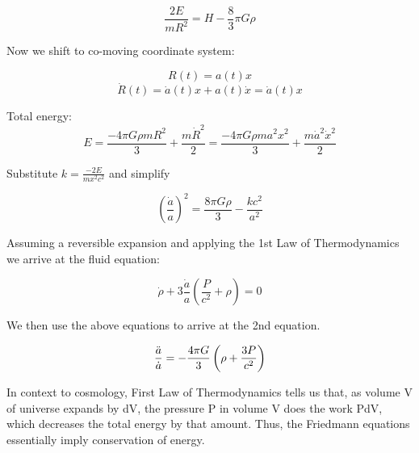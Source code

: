 \begin{equation*}
    \frac{2E}{mR^2}=H -\frac{8}{3} \pi G \rho
\end{equation*}

Now we shift to co-moving coordinate system:

\begin{equation*}
    R(t) = a(t) x
\end{equation*}
\begin{equation*}
     \Dot{R}(t) = \Dot{a}(t) x + a(t) \Dot{x} = \Dot{a}(t) x
\end{equation*}

Total energy:
\begin{equation*}
    E = \frac{-4 \pi G \rho m R^2}{3} + \frac{m \Dot{R}^2}{2} = \frac{-4 \pi G \rho ma^2 x^2}{3} + \frac{m \Dot{a}^2 \Dot{x}^2}{2}
\end{equation*}

Substitute $k = \frac{-2E}{mx^2c^2}$ and simplify

\begin{equation*}
    \left(\frac{\Dot{a}}{a}\right)^2 = \frac{8 \pi G \rho}{3} - \frac{kc^2}{a^2}
\end{equation*}

Assuming a reversible expansion and applying the 1st Law of Thermodynamics we arrive at the fluid equation:

\begin{equation*}
    \Dot{\rho} + 3\frac{\Dot{a}}{a}\left(\frac{P}{c^2} + \rho\right) = 0
\end{equation*}

We then use the above equations to arrive at the 2nd equation.

\begin{equation*}
    \frac{\Ddot{a}}{\Dot{a}} = -\frac{4 \pi G}{3}\left(\rho + \frac{3P}{c^2}\right)
\end{equation*}

In context to cosmology, First Law of Thermodynamics tells us that, as volume V of universe expands by dV, the pressure P in volume V does the work PdV, which decreases the total energy by that amount. Thus, the Friedmann equations essentially imply conservation of energy.

